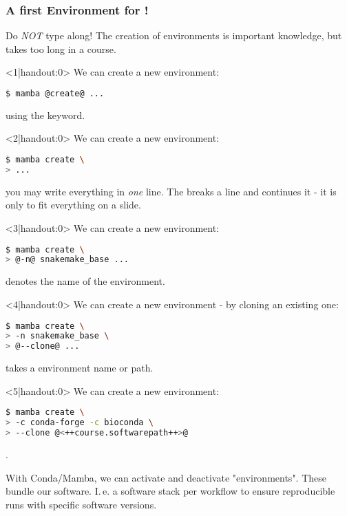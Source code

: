 \begin{frame}[fragile]
	\frametitle{A first Environment for \Snakemake!}
	\begin{warning}
		Do \emph{NOT} type along! The creation of environments is important knowledge, but takes too long in a course.
	\end{warning}
    \begin{onlyenv}<1|handout:0>
      We can create a new environment:
      \begin{lstlisting}[language=Bash, style=Shell]
$ mamba @create@ ...
      \end{lstlisting}
      using the  keyword.
    \end{onlyenv}
    \begin{onlyenv}<2|handout:0>
    	We can create a new environment:
    	\begin{lstlisting}[language=Bash, style=Shell]
$ mamba create \
> ...
    	\end{lstlisting}
    	you may write everything in \emph{one} line. The \altverb{\\} breaks a line and \altverb{>} continues it - it is only to fit everything on a slide.
    \end{onlyenv}
    \begin{onlyenv}<3|handout:0>
    	We can create a new environment:
    	\begin{lstlisting}[language=Bash, style=Shell]
$ mamba create \
> @-n@ snakemake_base ...
    	\end{lstlisting}
    	 denotes the name of the environment.
    \end{onlyenv}
    \begin{onlyenv}<4|handout:0>
    	We can create a new environment - by cloning an existing one:
    	\begin{lstlisting}[language=Bash, style=Shell]
$ mamba create \
> -n snakemake_base \
> @--clone@ ...
    	\end{lstlisting}
    	 takes a environment name or path.
    \end{onlyenv}
    \begin{onlyenv}<5|handout:0>
    	We can create a new environment:
    	\begin{lstlisting}[language=Bash, style=Shell]
$ mamba create \
> -c conda-forge -c bioconda \
> --clone @<++course.softwarepath++>@
    	\end{lstlisting}
    	.
    \end{onlyenv}
    \vfill
    \begin{docs}[What is an \emph{Environment}?]
    	With Conda/Mamba, we can activate and deactivate "environments". These bundle our software. I.\,e. a software stack per workflow to ensure reproducible runs with specific software versions.
    \end{docs}
\end{frame}


